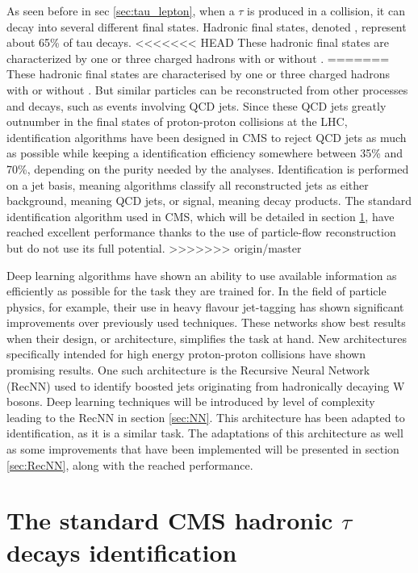 
As seen before in sec \ref{sec:tau_lepton}, when a $\tau$ is produced in a collision, it can decay into several different final states.
Hadronic final states, denoted \tauh, represent about 65\% of tau decays.
<<<<<<< HEAD
These hadronic final states are characterized by one or three charged hadrons with or without \pizero .
=======
These hadronic final states are characterised by one or three charged hadrons with or without \pizero . But similar particles can be reconstructed from other processes and decays, such as events involving QCD jets.
Since these QCD jets greatly outnumber \tauh in the final states of proton-proton collisions at the LHC, \tauh identification algorithms have been designed in CMS to reject QCD jets as much as possible while keeping a \tauh identification efficiency somewhere between 35\% and 70\%, depending on the purity needed by the analyses. Identification is performed on a jet basis, meaning algorithms classify all reconstructed jets as either background, meaning QCD jets, or signal, meaning \tauh decay products.
The standard \tauh identification algorithm used in CMS, which will be detailed in section \ref{sec:std_tau_id}, have reached excellent performance thanks to the use of particle-flow reconstruction but do not use its full potential. 
>>>>>>> origin/master

Deep learning algorithms have shown an ability to use available information as efficiently as possible for the task they are trained for. In the field of particle physics, for example, their use in heavy flavour jet-tagging \cite{btagging_NN} has shown significant improvements over previously used techniques. These networks show best results when their design, or architecture, simplifies the task at hand. New architectures specifically intended for high energy proton-proton collisions have shown promising results. One such architecture is the Recursive Neural Network (RecNN) \cite{Louppe:2017ipp} used to identify boosted jets originating from hadronically decaying W bosons. Deep learning techniques will be introduced by level of complexity leading to the RecNN in section \ref{sec:NN}. This architecture has been adapted to \tauh identification, as it is a similar task. The adaptations of this architecture as well as some improvements that have been implemented will be presented in section \ref{sec:RecNN}, along with the reached performance.

\section{The standard CMS hadronic $\tau$ decays identification}
\label{sec:std_tau_id}

